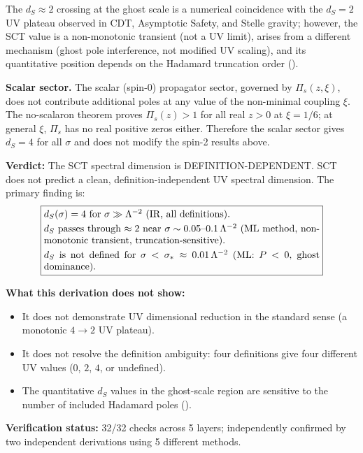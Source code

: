\documentclass[11pt,a4paper]{article}
\newcommand{\ds}{d_S}
\begin{document}
The $\ds \approx 2$ crossing at the ghost scale is a numerical
coincidence with the $\ds = 2$ UV plateau observed in CDT, Asymptotic
Safety, and Stelle gravity; however, the SCT value is a non-monotonic
transient (not a UV limit), arises from a different mechanism (ghost
pole interference, not modified UV scaling), and its quantitative
position depends on the Hadamard truncation order ().

\textbf{Scalar sector.} The scalar (spin-0) propagator sector,
governed by $\Pi_s(z, \xi)$, does not contribute additional poles
at any value of the non-minimal coupling $\xi$. The no-scalaron
theorem proves $\Pi_s(z) > 1$ for all real $z > 0$ at $\xi = 1/6$;
at general $\xi$, $\Pi_s$ has no real positive zeros either. Therefore
the scalar sector gives $\ds = 4$ for all $\sigma$ and does not modify
the spin-2 results above.

\textbf{Verdict:} The SCT spectral dimension is
\textcolor{caution}{DEFINITION-DEPENDENT}. SCT does not predict a clean,
definition-independent UV spectral dimension. The primary finding is:
\begin{equation}
  \boxed{
    \parbox{0.82\textwidth}{%
    $\ds(\sigma) = 4$ for $\sigma \gg \Lambda^{-2}$ (IR, all definitions).\\[3pt]
    $\ds$ passes through $\approx 2$ near
    $\sigma \sim 0.05$--$0.1\,\Lambda^{-2}$ (ML method, non-monotonic
    transient, truncation-sensitive).\\[3pt]
    $\ds$ is not defined for $\sigma < \sigma_* \approx 0.01\,\Lambda^{-2}$
    (ML: $P < 0$, ghost dominance).%
    }
  }
\end{equation}

\textbf{What this derivation does not show:}
\begin{itemize}[nosep]
  \item It does not demonstrate UV dimensional reduction in the standard sense
    (a monotonic $4 \to 2$ UV plateau).
  \item It does not resolve the definition ambiguity: four definitions give
    four different UV values ($0$, $2$, $4$, or undefined).
  \item The quantitative $\ds$ values in the ghost-scale region are sensitive
    to the number of included Hadamard poles ().
\end{itemize}

\textbf{Verification status:} 32/32 checks across 5 layers; independently
confirmed by two independent derivations using 5 different methods.
\end{document}
